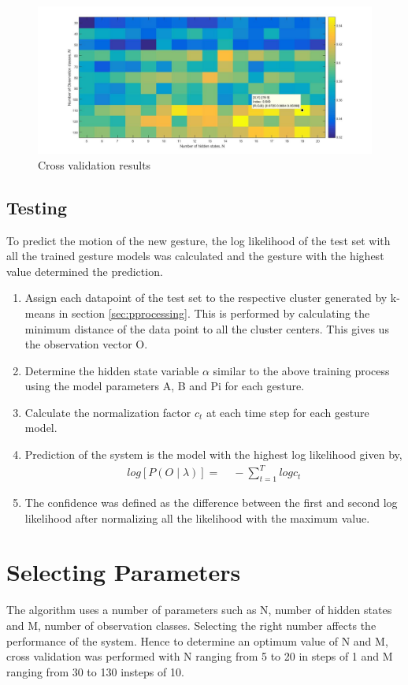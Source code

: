 \documentclass[fleqn,10pt]{SelfArx} %
\begin{document}
\begin{figure}
\centering
\includegraphics[scale=0.4]{cv.jpg}
\caption{Cross validation results}
\label{fig:cv}
\end{figure}

\subsection{Testing}
To predict the motion of the new gesture, the log likelihood of the test set with all the trained gesture models was calculated and the gesture with the highest value determined the prediction.
\begin{enumerate}
\item Assign each datapoint of the test set to the respective cluster generated by k-means in section \ref{sec:pprocessing}. This is performed by calculating the minimum distance of the data point to all the cluster centers. This gives us the observation vector O.
\item Determine the hidden state variable $\alpha$ similar to the above training process using the model parameters A, B and Pi for each gesture.
\item Calculate the normalization factor $c_t$ at each time step for each gesture model.
\item Prediction of the system is the model with the highest log likelihood given by,
\begin{align*}
log\left[P(O\mid \lambda)\right] =&\; - \sum_{t=1}^T log c_t
\end{align*}
\vspace{-0.7cm}
\item The confidence was defined as the difference between the first and second log likelihood after normalizing all the likelihood with the maximum value.
\end{enumerate}

\section{Selecting Parameters}
\label{sec:param}
The algorithm uses a number of parameters such as N, number of hidden states and M, number of observation classes. Selecting the right number affects the performance of the system. Hence to determine an optimum value of N and M, cross validation was performed with N ranging from 5 to 20 in steps of 1 and M ranging from 30 to 130 insteps of 10.
\end{document}
